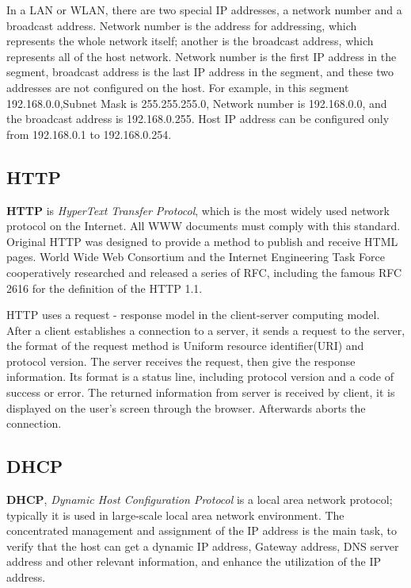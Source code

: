 In a LAN or WLAN, there are two special IP addresses, a network number and a broadcast address. Network number is the address for addressing, which represents the whole network itself; another is the broadcast address, which represents all of the host network. Network number is the first IP address in the segment, broadcast address is the last IP address in the segment, and these two addresses are not configured on the host. For example, in this segment 192.168.0.0,Subnet Mask is 255.255.255.0, Network number is 192.168.0.0, and the broadcast address is 192.168.0.255. Host IP address can be configured only from 192.168.0.1 to 192.168.0.254.  

\subsection{HTTP}

\textbf{HTTP} is \textit{HyperText Transfer Protocol}, which is the most widely used network protocol on the Internet. All WWW documents must comply with this standard. Original HTTP was designed to provide a method to publish and receive HTML pages. World Wide Web Consortium and the Internet Engineering Task Force cooperatively researched and released a series of RFC, including the famous RFC 2616 for the definition of the HTTP 1.1.   

HTTP uses a request - response model in the client-server computing model. After a client establishes a connection to a server, it sends a request to the server, the format of the request method is Uniform resource identifier(URI) and protocol version. The server receives the request, then give the response information. Its format is a status line, including protocol version and a code of success or error. The returned information from server is received by client, it is displayed on the user's screen through the browser. Afterwards aborts the connection.

\subsection{DHCP}
\textbf{DHCP}, \textit{Dynamic Host Configuration Protocol} is a local area network protocol; typically it is used in large-scale local area network environment. The concentrated management and assignment of the IP address is the main task, to verify that the host can get a dynamic IP address, Gateway address, DNS server address and other relevant information, and enhance the utilization of the IP address.  

